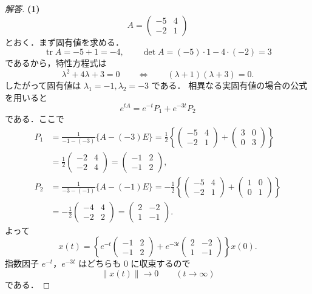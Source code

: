 \documentclass[article,paper=a4paper]{jlreq}
\begin{document}
\begin{proof}[解答]
\textbf{(1)}
\[
  A=
  \begin{pmatrix}
    -5 & 4\\
    -2 & 1
  \end{pmatrix}
\]
とおく．まず固有値を求める．
\[
  \operatorname{tr}A=-5+1=-4,
  \qquad
  \det A=(-5)\cdot1-4\cdot(-2)=3
\]
であるから，特性方程式は
\[
  \lambda^2+4\lambda+3=0
  \qquad\Longleftrightarrow\qquad
  (\lambda+1)(\lambda+3)=0.
\]
したがって固有値は $\lambda_1=-1,\lambda_2=-3$ である．
相異なる実固有値の場合の公式を用いると
\[
  e^{tA}=e^{-t}P_1+e^{-3t}P_2
\]
である．ここで
\begin{align*}
  P_1
    &=
    \frac{1}{-1-(-3)}\{A-(-3)E\}
     =
    \frac{1}{2}
    \left\{
    \begin{pmatrix}
      -5 & 4\\
      -2 & 1
    \end{pmatrix}
    +
    \begin{pmatrix}
      3 & 0\\
      0 & 3
    \end{pmatrix}
    \right\} \\
    &=
    \frac{1}{2}
    \begin{pmatrix}
      -2 & 4\\
      -2 & 4
    \end{pmatrix}
     =
    \begin{pmatrix}
      -1 & 2\\
      -1 & 2
    \end{pmatrix},\\
  P_2
    &=
    \frac{1}{-3-(-1)}\{A-(-1)E\}
     =
    -\frac{1}{2}
    \left\{
    \begin{pmatrix}
      -5 & 4\\
      -2 & 1
    \end{pmatrix}
    +
    \begin{pmatrix}
      1 & 0\\
      0 & 1
    \end{pmatrix}
    \right\}\\
    &=
    -\frac{1}{2}
    \begin{pmatrix}
      -4 & 4\\
      -2 & 2
    \end{pmatrix}
     =
    \begin{pmatrix}
      2 & -2\\
      1 & -1
    \end{pmatrix}.
\end{align*}
よって
\[
  x(t)
    =
    \left\{
      e^{-t}
      \begin{pmatrix}
        -1 & 2\\
        -1 & 2
      \end{pmatrix}
      +
      e^{-3t}
      \begin{pmatrix}
        2 & -2\\
        1 & -1
      \end{pmatrix}
    \right\}x(0).
\]
指数因子 $e^{-t}$，$e^{-3t}$ はどちらも $0$ に収束するので
\[
  \|x(t)\|\to0
  \qquad (t\to\infty)
\]
である．


\end{proof}
\end{document}
